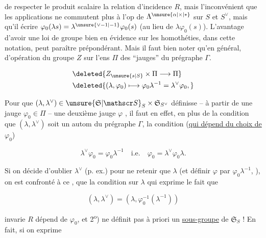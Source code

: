 
de respecter le produit scalaire  la relation d'incidence $R$, mais l'inconvénient que les applications ne commutent plus à l'op de $\Lambda^{\unsure{\alpha|\times|*}}$ sur  $S$ et $S^\vee$, mais qu'il  écrire $\varphi_0(\lambda s)=\lambda^{\unsure{\vee-1|-1}}\varphi_0(s)$ (au lieu de $\lambda\varphi_0(s)$). L'avantage d'avoir une loi de groupe bien en évidence sur les homothéties, dans cette notation, peut paraître prépondérant. Mais il faut bien noter qu'en général,  d'opération du groupe $Z$ sur l'ens $\Pi$ des ``jauges'' du prégraphe $\Gamma$.


\[
\begin{aligned}
&\deleted{Z_{\unsure{s|S}}\times\Pi\longrightarrow\Pi}\\
&\deleted{(\lambda,\varphi_0)\longmapsto\varphi_0\lambda^{-1}=\lambda^\vee\varphi_0,}
\end{aligned}
\]

Pour que $(\lambda,\lambda^\vee)\in\unsure{\mathfrak S|\mathscr S}_S\times\mathfrak S_{S^\vee}$ définisse  -- à partir de  une jauge $\varphi_0\in\Pi$ -- une deuxième jauge $\varphi$ , il faut en effet, en plus de la condition que $(\lambda,\lambda^\vee)$ soit un autom du prégraphe $\Gamma$, la condition (\uline{qui dépend du choix de $\varphi_0$})

\[
\lambda^\vee\varphi_0=\varphi_0\lambda^{-1}\quad\text{i.e.}\quad\varphi_0=\lambda^\vee\varphi_0\lambda. \tag*{(65)}
\]

Si on décide d'oublier $\lambda^\vee$ (p. ex.) pour ne retenir que $\lambda$ (et définir $\varphi$ par $\varphi_0\lambda^{-1}$, ), on est confronté à ce , que la condition sur $\lambda$ qui exprime le  fait que

\[
(\lambda,\lambda^\vee)=(\lambda,\varphi_0^{-1}(\lambda^{-1}))
\]

 invarie $R$  dépend de $\varphi_0$, et 2\textsuperscript{o}) ne définit pas à priori un \uline{sous-groupe} de $\mathfrak S_S$ ! En fait, si on exprime

